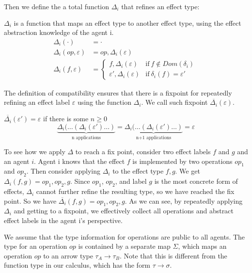 Then we define the a total function $\Delta_i$ that refines an effect type:
\begin{definition}
$\Delta_i$ is a function that maps an effect type to another effect type, using the effect abstraction knowledge of the agent i.
\begin{align*}
\Delta_i(\cdot) &= \cdot \\
\Delta_i(op, \varepsilon) &= op, \Delta_i(\varepsilon) \\
\Delta_i(f, \varepsilon) &= 
    \begin{cases}
      f, \Delta_i(\varepsilon) & \text{if}\ f \not\in Dom(\delta_i)  \ \\
      \varepsilon', \Delta_i(\varepsilon) & \text{if}\ \delta_i(f) = \varepsilon'
    \end{cases}
\end{align*}
\end{definition}

The definition of compatibility ensures that there is a fixpoint for repeatedly refining an effect label $\varepsilon$ using the function $\Delta_i$. We call such fixpoint $\overline{\Delta_i}(\varepsilon)$. 


\begin{definition}
$\overline{\Delta_i}(\varepsilon') = \varepsilon$ if there is some $n \geq 0$
\[
    \underbrace{\Delta_i(\dots (\Delta_i(\varepsilon') \dots )}_\text{n applications}   = 
    \underbrace{\Delta_i(\dots (\Delta_i(\varepsilon') \dots )}_\text{n+1 applications}   = \varepsilon
 \]
 \end{definition}
 
 To see how we apply $\Delta$ to reach a fix point, consider two effect labels $f$ and $g$ and an agent $i$. Agent i knows that the effect $f$ is implemented by two operations $op_1$ and $op_2$. Then consider applying $\Delta_i$ to the effect type $f, g$. We get $\Delta_i(f, g) = op_1, op_2, g$. Since $op_1$, $op_2$, and label $g$ is the most concrete form of effects, $\Delta_i$ cannot further refine the resulting type, so we have reached the fix point. So we have $\overline{\Delta_i}(f, g) = op_1, op_2, g$. As we can see, by repeatedly applying $\Delta_i$ and getting to a fixpoint, we effectively collect all operations and abstract effect labels in the agent i's perspective.



 We assume that the type information for operations are public to all agents. The type  for an operation $op$ is contained by a separate map $\Sigma$, which maps an operation $op$ to an arrow type $\tau_A \rightarrow \tau_B$. Note that this is different from the function type in our calculus, which has the form $\tau \rightarrow \sigma$.




